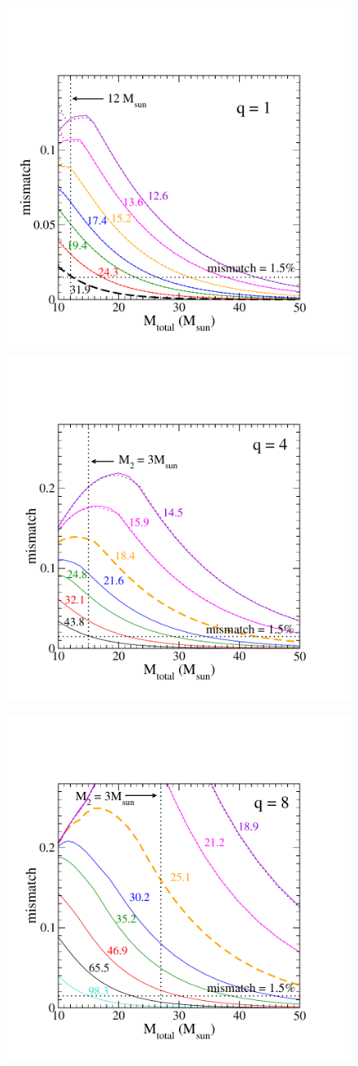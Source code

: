 \begin{figure}
\includegraphics[width=0.55\columnwidth]{figures/nrhybbank/maxmismatchVSmass_q1.pdf}
\includegraphics[width=0.55\columnwidth]{figures/nrhybbank/maxmismatchVSmass_q4.pdf}
\begin{center}
\includegraphics[width=0.6\columnwidth]{figures/nrhybbank/maxmismatchVSmass_q8.pdf}

\end{center}
\end{figure}
